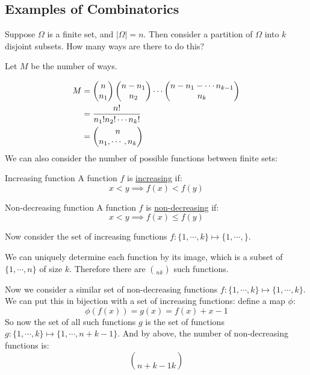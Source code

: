 \documentclass[../Main.tex]{subfiles}
\begin{document}
\subsection{Examples of Combinatorics}
Suppose $\Omega$ is a finite set, and $|\Omega| = n$. Then consider a partition of $\Omega$ into $k$ disjoint subsets. How many ways are there to do this?\par
Let $M$ be the number of ways.\par
\begin{align*}
    M &= \choose{n}{n_1} \choose{n - n_1}{n_2} \cdots \choose{n - n_1 - \cdots n_{k-1}}{n_k} \\
    &= \frac{n!}{n_1! n_2! \cdots n_k!} \\
    &= \choose{n}{n_1, \cdots, n_k}
\end{align*}
We can also consider the number of possible functions between finite sets:
\begin{definition}{Increasing function}
    A function $f$ is \underline{increasing} if:
    \begin{equation*}
        x < y \implies f(x) < f(y)
    \end{equation*}
\end{definition}
\begin{definition}{Non-decreasing function}
    A function $f$ is \underline{non-decreasing} if:
    \begin{equation*}
        x < y \implies f(x) \leq f(y)
    \end{equation*}
\end{definition}
Now consider the set of increasing functions $f : \{1, \cdots, k\} \mapsto \{1, \cdots, \}$.\par
We can uniquely determine each function by its image, which is a subset of $\{1, \cdots, n\}$ of size $k$. Therefore there are $\choose{n}{k}$ such functions.\par
Now we consider a similar set of non-decreasing functions $f : \{1, \cdots, k\} \mapsto \{1, \cdots, k\}$. We can put this in bijection with a set of increasing functions: define a map $\phi$:
\begin{equation*}
    \phi(f(x)) = g(x) = f(x) + x - 1
\end{equation*}
So now the set of all such functions $g$ is the set of functions $g : \{1, \cdots, k\} \mapsto \{1, \cdots, n + k - 1\}$. And by above, the number of non-decreasing functions is:
\begin{equation*}
    \choose{n + k - 1}{k}
\end{equation*}
\end{document}
